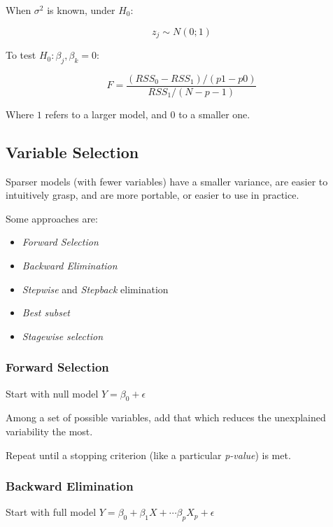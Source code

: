 \documentclass[twoside,twocolumn,10pt]{revtex4-1}
\begin{document}
	When $\sigma^2$ is known, under $H_0$:
	
	\begin{equation*}
	z_j \sim N(0;1)
	\end{equation*}
	
	To test $H_0 : \beta_j, \beta_k = 0$:
	
	\begin{equation*}
	F = \frac{(RSS_0 - RSS_1)/(p1-p0)}{RSS_1/(N-p-1)}
	\end{equation*}
	
	Where $1$ refers to a larger model, and $0$ to a smaller one.
	
	\subsection{Variable Selection}
	
	Sparser models (with fewer variables) have a smaller variance, are easier to intuitively grasp, and are more portable, or easier to use in practice.
	
	Some approaches are:
	
	\begin{itemize}
	\item \textit{Forward Selection}
	\item \textit{Backward Elimination}
	\item \textit{Stepwise} and \textit{Stepback} elimination
	\item \textit{Best subset}
	\item \textit{Stagewise selection}
	\end{itemize}
	
	\subsubsection{Forward Selection}
	
	Start with null model $Y = \beta_0 + \epsilon$
	
	Among a set of possible variables, add that which reduces the unexplained variability the most.
	
	Repeat until a stopping criterion (like a particular \textit{p-value}) is met.
	
	\subsubsection{Backward Elimination}
	
	Start with full model $Y = \beta_0 + \beta_1 X + \cdots \beta_p X_p + \epsilon$
	
\end{document}
